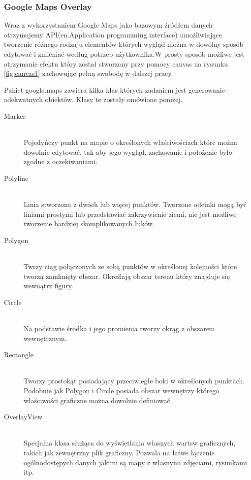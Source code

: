 \subsubsection{Google Maps Overlay}
\label{subsubsec:overlays}

Wraz z wykorzystaniem Google Maps jako bazowym źródłem danych otrzymujemy API(en.Application programming interface) umożliwiające tworzenie różnego rodzaju elementów których wygląd można w dowolny sposób edytować i zmieniać według potrzeb użytkownika.W prosty sposób możliwe jest otrzymanie efektu który został stworzony przy pomocy canvas na rysunku \ref{fig:canvas1} zachowując pełną swobodę w dalszej pracy.

Pakiet google.maps zawiera kilka klas których zadaniem jest generowanie adekwatnych obiektów. Klasy te zostały omówione poniżej.

\begin{description}
\item[Marker] \hfill \\
    Pojedyńczy punkt na mapie o określonych właściwościach które można dowolnie edytować, tak aby jego wygląd, zachowanie i położenie było zgodne z oczekiwaniami.

\item[Polyline] \hfill \\
  Linia stworzona z dwóch lub więcej punktów. Tworzone odcinki mogą być liniami prostymi lub przedstawiać zakrzywienie ziemi, nie jest możliwe tworzenie bardziej skomplikowanych łuków.

\item[Polygon] \hfill \\
  Twrzy ciąg połączonych ze sobą punktów w określonej kolejności które tworzą zamknięty obszar. Określają obszar terenu który znajduje się wewnątrz figury.

\item[Circle] \hfill \\
  Na podstawie środka i jego promienia tworzy okrąg z obszarem wewnętrznym.

\item[Rectangle] \hfill \\
  Tworzy prostokąt posiadający przeciwległe boki w określonych punktach. Podobnie jak Polygon i Circle posiada obszar wewnętrzy którego właściwości graficzne można dowolnie definiować.

\item[OverlayView] \hfill \\
  Specjalna klasa służąca do wyświetlania własnych wartsw graficznych, takich jak zewnętrzny plik graficzny. Pozwala na łatwe łączenie ogólnodostępych danych jakimi są mapy z własnymi zdjęciami, rysunkami itp.

\end{description}


